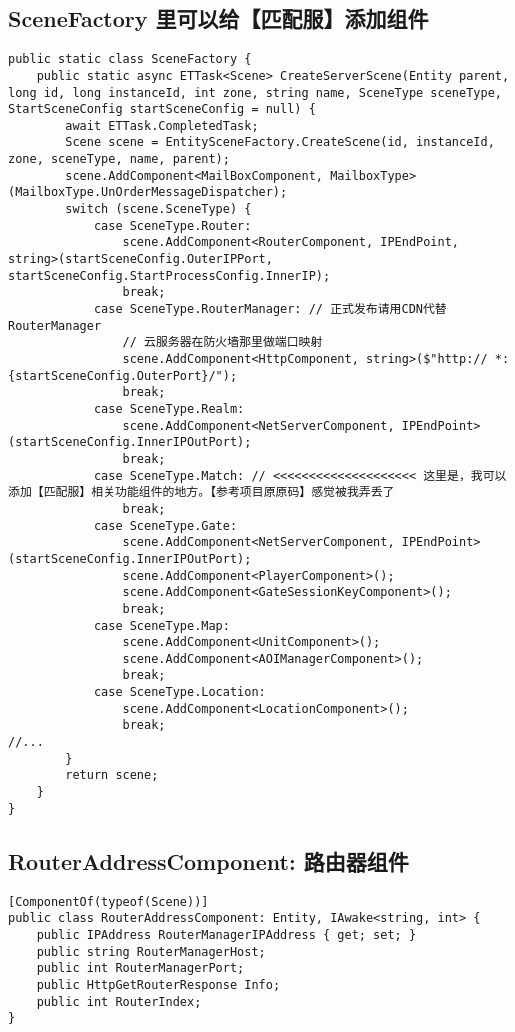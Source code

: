 \documentclass[9pt, b5paper]{article}
\begin{document}
\subsection{SceneFactory 里可以给【匹配服】添加组件}
\label{sec-7-3}
\begin{verbatim}
public static class SceneFactory {
    public static async ETTask<Scene> CreateServerScene(Entity parent, long id, long instanceId, int zone, string name, SceneType sceneType, StartSceneConfig startSceneConfig = null) {
        await ETTask.CompletedTask;
        Scene scene = EntitySceneFactory.CreateScene(id, instanceId, zone, sceneType, name, parent);
        scene.AddComponent<MailBoxComponent, MailboxType>(MailboxType.UnOrderMessageDispatcher);
        switch (scene.SceneType) {
            case SceneType.Router:
                scene.AddComponent<RouterComponent, IPEndPoint, string>(startSceneConfig.OuterIPPort, startSceneConfig.StartProcessConfig.InnerIP);
                break;
            case SceneType.RouterManager: // 正式发布请用CDN代替RouterManager
                // 云服务器在防火墙那里做端口映射
                scene.AddComponent<HttpComponent, string>($"http:// *:{startSceneConfig.OuterPort}/");
                break;
            case SceneType.Realm:
                scene.AddComponent<NetServerComponent, IPEndPoint>(startSceneConfig.InnerIPOutPort);
                break;
            case SceneType.Match: // <<<<<<<<<<<<<<<<<<<< 这里是，我可以添加【匹配服】相关功能组件的地方。【参考项目原原码】感觉被我弄丢了
                break;
            case SceneType.Gate:
                scene.AddComponent<NetServerComponent, IPEndPoint>(startSceneConfig.InnerIPOutPort);
                scene.AddComponent<PlayerComponent>();
                scene.AddComponent<GateSessionKeyComponent>();
                break;
            case SceneType.Map:
                scene.AddComponent<UnitComponent>();
                scene.AddComponent<AOIManagerComponent>();
                break;
            case SceneType.Location:
                scene.AddComponent<LocationComponent>();
                break;
//...
        }
        return scene;
    }
}
\end{verbatim}
\subsection{RouterAddressComponent: 路由器组件}
\label{sec-7-4}
\begin{verbatim}
[ComponentOf(typeof(Scene))]
public class RouterAddressComponent: Entity, IAwake<string, int> {
    public IPAddress RouterManagerIPAddress { get; set; }
    public string RouterManagerHost;
    public int RouterManagerPort;
    public HttpGetRouterResponse Info;
    public int RouterIndex;
}
\end{verbatim}
\end{document}
